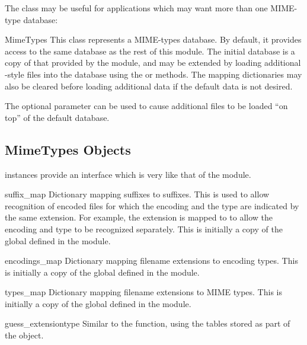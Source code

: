 The  class may be useful for applications which may
want more than one MIME-type database:

\begin{classdesc}{MimeTypes}{}
  This class represents a MIME-types database.  By default, it
  provides access to the same database as the rest of this module.
  The initial database is a copy of that provided by the module, and
  may be extended by loading additional -style files
  into the database using the  or 
  methods.  The mapping dictionaries may also be cleared before
  loading additional data if the default data is not desired.

  The optional  parameter can be used to cause
  additional files to be loaded ``on top'' of the default database.
\end{classdesc}


\subsection{MimeTypes Objects \label{mimetypes-objects}}

 instances provide an interface which is very like
that of the  module.

\begin{datadesc}{suffix_map}
  Dictionary mapping suffixes to suffixes.  This is used to allow
  recognition of encoded files for which the encoding and the type are
  indicated by the same extension.  For example, the 
  extension is mapped to  to allow the encoding and type
  to be recognized separately.  This is initially a copy of the global
   defined in the module.
\end{datadesc}

\begin{datadesc}{encodings_map}
  Dictionary mapping filename extensions to encoding types.  This is
  initially a copy of the global  defined in the
  module.
\end{datadesc}

\begin{datadesc}{types_map}
  Dictionary mapping filename extensions to MIME types.  This is
  initially a copy of the global  defined in the
  module.
\end{datadesc}

\begin{methoddesc}{guess_extension}{type}
  Similar to the  function, using the
  tables stored as part of the object.
\end{methoddesc}

